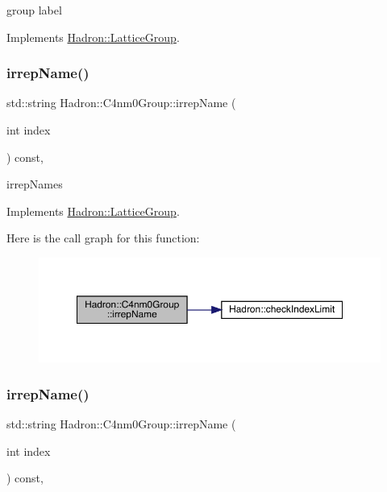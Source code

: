group label 

Implements \mbox{\hyperlink{structHadron_1_1LatticeGroup_a82208a322bf1b1db489f16af38e70087}{Hadron\+::\+Lattice\+Group}}.

\mbox{\label{structHadron_1_1C4nm0Group_ae7e7c420d17cacaed69a74902af72dcc}} 
\subsubsection{\texorpdfstring{irrepName()}{irrepName()}\hspace{0.1cm}{\footnotesize\ttfamily [1/2]}}
{\footnotesize\ttfamily std\+::string Hadron\+::\+C4nm0\+Group\+::irrep\+Name (\begin{DoxyParamCaption}\item[{int}]{index }\end{DoxyParamCaption}) const\hspace{0.3cm}{\ttfamily [inline]}, {\ttfamily [virtual]}}

irrep\+Names 

Implements \mbox{\hyperlink{structHadron_1_1LatticeGroup_a4bc5620218c2a73157e19bc4451fe746}{Hadron\+::\+Lattice\+Group}}.

Here is the call graph for this function\+:
\nopagebreak
\begin{figure}[H]
\begin{center}
\leavevmode
\includegraphics[width=350pt]{da/da1/structHadron_1_1C4nm0Group_ae7e7c420d17cacaed69a74902af72dcc_cgraph}
\end{center}
\end{figure}
\mbox{\label{structHadron_1_1C4nm0Group_ae7e7c420d17cacaed69a74902af72dcc}} 
\subsubsection{\texorpdfstring{irrepName()}{irrepName()}\hspace{0.1cm}{\footnotesize\ttfamily [2/2]}}
{\footnotesize\ttfamily std\+::string Hadron\+::\+C4nm0\+Group\+::irrep\+Name (\begin{DoxyParamCaption}\item[{int}]{index }\end{DoxyParamCaption}) const\hspace{0.3cm}{\ttfamily [inline]}, {\ttfamily [virtual]}}


